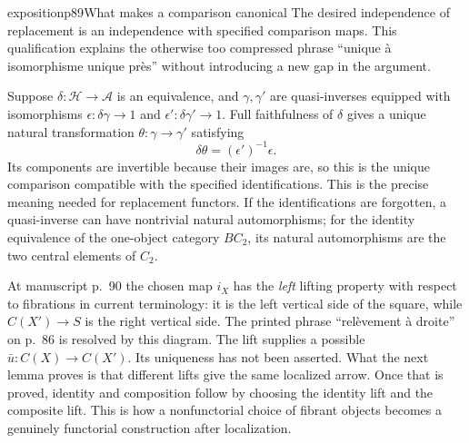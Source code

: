 \begin{dcomment}{exposition}{p89}{What makes a comparison canonical}
The desired independence of replacement is an independence with specified comparison maps. This qualification explains the otherwise too compressed phrase ``unique \`a isomorphisme unique pr\`es'' without introducing a new gap in the argument.

Suppose $\delta:\mathcal H\to\mathcal A$ is an equivalence, and $\gamma,\gamma'$ are quasi-inverses equipped with isomorphisms $\epsilon:\delta\gamma\to1$ and $\epsilon':\delta\gamma'\to1$. Full faithfulness of $\delta$ gives a unique natural transformation $\theta:\gamma\to\gamma'$ satisfying
\[
 \delta\theta=(\epsilon')^{-1}\epsilon.
\]
Its components are invertible because their images are, so this is the unique comparison compatible with the specified identifications. This is the precise meaning needed for replacement functors. If the identifications are forgotten, a quasi-inverse can have nontrivial natural automorphisms; for the identity equivalence of the one-object category $BC_2$, its natural automorphisms are the two central elements of $C_2$.

At manuscript p.~90 the chosen map $i_X$ has the \emph{left} lifting property with respect to fibrations in current terminology: it is the left vertical side of the square, while $C(X')\to S$ is the right vertical side. The printed phrase ``rel\`evement \`a droite'' on p.~86 is resolved by this diagram. The lift supplies a possible $\bar u:C(X)\to C(X')$. Its uniqueness has not been asserted. What the next lemma proves is that different lifts give the same localized arrow. Once that is proved, identity and composition follow by choosing the identity lift and the composite lift. This is how a nonfunctorial choice of fibrant objects becomes a genuinely functorial construction after localization.
\end{dcomment}


